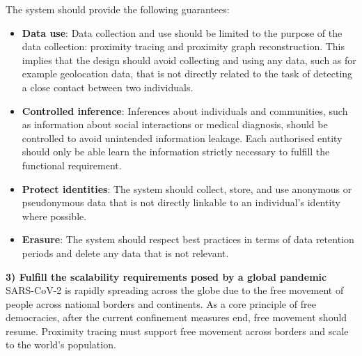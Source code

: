 \documentclass[10.8pt,a4paper]{article}
\begin{document}
The system should provide the following guarantees:
\begin{itemize}\itemsep0pt
\item \textbf{Data use}: Data collection and use should be limited to the purpose of the data collection: proximity tracing and proximity graph reconstruction. This implies that the design should avoid collecting and using any data, such as for example geolocation
data, that is not directly related to the task of detecting a close contact between two
individuals.
\item \textbf{Controlled inference}: Inferences about individuals and communities, such as
information about social interactions or medical diagnosis, should be controlled to
avoid unintended information leakage. Each authorised entity should only be able
learn the information strictly necessary to fulfill the functional requirement.
\item \textbf{Protect identities}: The system should collect, store, and use anonymous or
pseudonymous data that is not directly linkable to an individual’s identity where
possible.
\item \textbf{Erasure}: The system should respect best practices in terms of data retention periods and delete any data that is not relevant.
\end{itemize}
\textbf{3) Fulfill the scalability requirements posed by a global pandemic}\\
SARS-CoV-2 is rapidly spreading across the globe due to the free movement of people
across national borders and continents. As a core principle of free democracies, after the
current confinement measures end, free movement should resume. Proximity tracing must
support free movement across borders and scale to the world’s population.
\end{document}
